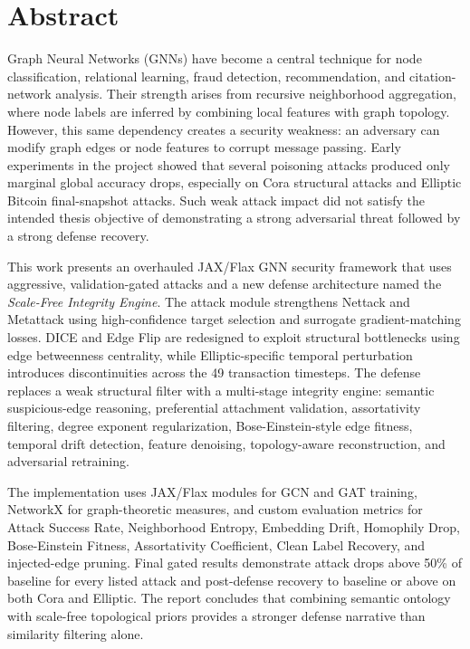 \documentclass[12pt,oneside]{report}
\begin{document}
\chapter*{Abstract}
Graph Neural Networks (GNNs) have become a central technique for node classification, relational learning, fraud detection, recommendation, and citation-network analysis. Their strength arises from recursive neighborhood aggregation, where node labels are inferred by combining local features with graph topology. However, this same dependency creates a security weakness: an adversary can modify graph edges or node features to corrupt message passing. Early experiments in the project showed that several poisoning attacks produced only marginal global accuracy drops, especially on Cora structural attacks and Elliptic Bitcoin final-snapshot attacks. Such weak attack impact did not satisfy the intended thesis objective of demonstrating a strong adversarial threat followed by a strong defense recovery.

This work presents an overhauled JAX/Flax GNN security framework that uses aggressive, validation-gated attacks and a new defense architecture named the \textit{Scale-Free Integrity Engine}. The attack module strengthens Nettack and Metattack using high-confidence target selection and surrogate gradient-matching losses. DICE and Edge Flip are redesigned to exploit structural bottlenecks using edge betweenness centrality, while Elliptic-specific temporal perturbation introduces discontinuities across the 49 transaction timesteps. The defense replaces a weak structural filter with a multi-stage integrity engine: semantic suspicious-edge reasoning, preferential attachment validation, assortativity filtering, degree exponent regularization, Bose-Einstein-style edge fitness, temporal drift detection, feature denoising, topology-aware reconstruction, and adversarial retraining.

The implementation uses JAX/Flax modules for GCN and GAT training, NetworkX for graph-theoretic measures, and custom evaluation metrics for Attack Success Rate, Neighborhood Entropy, Embedding Drift, Homophily Drop, Bose-Einstein Fitness, Assortativity Coefficient, Clean Label Recovery, and injected-edge pruning. Final gated results demonstrate attack drops above 50\% of baseline for every listed attack and post-defense recovery to baseline or above on both Cora and Elliptic. The report concludes that combining semantic ontology with scale-free topological priors provides a stronger defense narrative than similarity filtering alone.
\end{document}
